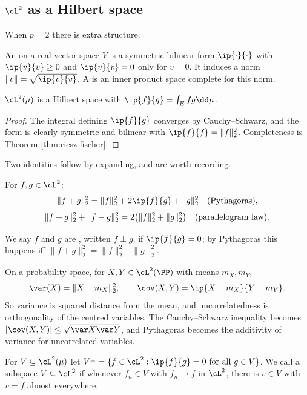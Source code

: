 \subsection{\texorpdfstring{$\cL^2$}{L2} as a Hilbert space}

When $p=2$ there is extra structure.

\begin{definition}
	An  on a real vector space $V$ is a symmetric bilinear form $\ip{\cdot}{\cdot}$ with $\ip{v}{v} \geq 0$ and $\ip{v}{v}=0$ only for $v = 0$. It induces a norm $\|v\|=\sqrt{\ip{v}{v}}$. A  is an inner product space complete for this norm.
\end{definition}

\begin{corollary}
	$\cL^2(\mu)$ is a Hilbert space with $\ip{f}{g} = \int_E fg\dd\mu$.
\end{corollary}
\begin{proof}
	The integral defining $\ip{f}{g}$ converges by Cauchy--Schwarz, and the form is clearly symmetric and bilinear with $\ip{f}{f}=\|f\|_2^2$. Completeness is Theorem \ref{thm:riesz-fischer}.
\end{proof}

Two identities follow by expanding, and are worth recording.

\begin{lemma}
	For $f,g\in\cL^2$:
	$$
	\|f+g\|_2^2 = \|f\|_2^2 + 2\ip{f}{g}+\|g\|_2^2 \quad \textup{(Pythagoras)},
	$$
	$$
	\|f+g\|_2^2 + \|f-g\|_2^2 = 2\big(\|f\|_2^2+\|g\|_2^2\big) \quad \textup{(parallelogram law)}.
	$$
\end{lemma}

We say $f$ and $g$ are , written $f \perp g$, if $\ip{f}{g}=0$; by Pythagoras this happens iff $\|f+g\|_2^2=\|f\|_2^2+\|g\|_2^2$.

\begin{example}
	On a probability space, for $X,Y \in \cL^2(\PP)$ with means $m_X, m_Y$,
	$$
	\var(X) = \|X - m_X\|_2^2, \qquad \cov(X,Y) = \ip{X-m_X}{Y-m_Y}.
	$$
	So variance is squared distance from the mean, and uncorrelatedness is orthogonality of the centred variables. The Cauchy--Schwarz inequality becomes $|\cov(X,Y)|\leq\sqrt{\var X \var Y}$, and Pythagoras becomes the additivity of variance for uncorrelated variables.
\end{example}

\begin{definition}
	For $V\subseteq \cL^2(\mu)$ let $V^\perp = \{f \in \cL^2 : \ip{f}{g} = 0 \text{ for all } g \in V\}$. We call a subspace $V \subseteq \cL^2$  if whenever $f_n \in V$ with $f_n \to f$ in $\cL^2$, there is $v \in V$ with $v = f$ almost everywhere.
\end{definition}

